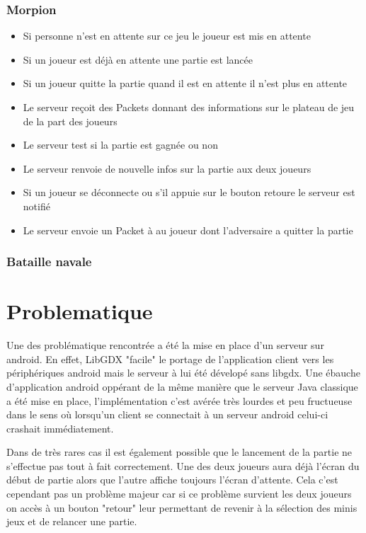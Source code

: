 \documentclass{report}
\begin{document}
\subsection{Morpion}
\begin{itemize}
  \item Si personne n'est en attente sur ce jeu le joueur est mis en attente
  \item Si un joueur est déjà en attente une partie est lancée
  \item Si un joueur quitte la partie quand il est en attente il n'est plus en attente
  \item Le serveur reçoit des Packets donnant des informations sur le plateau de jeu de la part des joueurs
  \item Le serveur test si la partie est gagnée ou non
  \item Le serveur renvoie de nouvelle infos sur la partie aux deux joueurs
  \item Si un joueur se déconnecte ou s'il appuie sur le bouton retoure le serveur est notifié
  \item Le serveur envoie un Packet à au joueur dont l'adversaire a quitter la partie
\end{itemize}

\subsection{Bataille navale}





\chapter{Problematique}
Une des problématique rencontrée a été la mise en place d'un serveur sur android. En effet, LibGDX "facile" le portage de l'application client vers les
périphériques android mais le serveur à lui été dévelopé sans libgdx. Une ébauche d'application android oppérant de la même manière que le serveur Java classique a
été mise en place, l'implémentation c'est avérée très lourdes et peu fructueuse dans le sens où lorsqu'un client se connectait à un serveur android celui-ci crashait
immédiatement.

Dans de très rares cas il est également possible que le lancement de la partie ne s'effectue pas tout à fait correctement. Une des deux joueurs aura déjà l'écran du début de partie alors
que l'autre affiche toujours l'écran d'attente. Cela c'est cependant pas un problème majeur car si ce problème survient les deux joueurs on accès à un bouton "retour" leur
permettant de revenir à la sélection des minis jeux et de relancer une partie.
\end{document}
